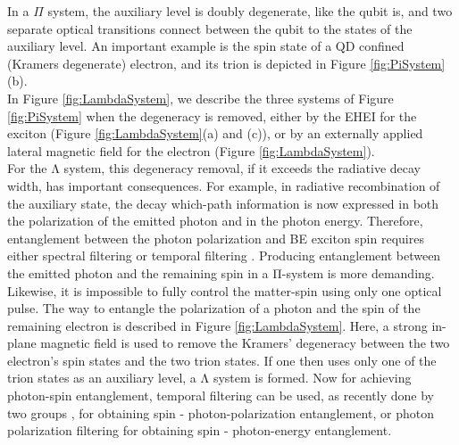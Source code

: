 In a $\Pi$ system, the auxiliary level is doubly degenerate, like the qubit is, and two separate optical transitions connect between the qubit to the states of the auxiliary level. An important example is the spin state of a QD confined (Kramers degenerate) electron, and its trion is depicted in Figure \ref{fig:PiSystem}(b).\\
In Figure \ref{fig:LambdaSystem}, we describe the three systems of Figure \ref{fig:PiSystem} when the degeneracy is removed, either by the EHEI for the exciton (Figure \ref{fig:LambdaSystem}(a) and
(c)), or by an externally applied lateral magnetic field for the electron (Figure \ref{fig:LambdaSystem}).\\
For the Λ system, this degeneracy removal, if it exceeds the radiative decay width, has important consequences. For example, in radiative recombination of the auxiliary state, the decay  which-path information is now expressed in both the polarization of the emitted photon and in the photon energy. Therefore, entanglement between the photon polarization and BE exciton spin requires either spectral filtering \cite{Hafenbrak2007} or temporal filtering \cite{Akopian2006}.
Producing entanglement between the emitted photon and the remaining spin in a Π-system is more demanding. Likewise, it is impossible to fully control the matter-spin using only one optical pulse. The way to entangle the polarization of a photon and the spin of the remaining electron is described in Figure \ref{fig:LambdaSystem}. Here, a strong in-plane magnetic field is used to remove the Kramers' degeneracy between the two electron's spin states and the two trion states. If one then uses only one of the trion states as an auxiliary level, a Λ system is formed. Now for achieving photon-spin entanglement, temporal filtering can be used, as recently done by two groups \cite{DeGreve2012} \cite{Schaibley2013}, for obtaining spin - photon-polarization entanglement, or photon polarization filtering \cite{Gao2012} for obtaining spin - photon-energy entanglement.
